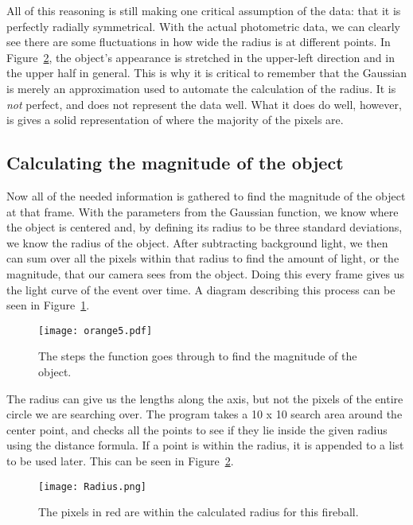 All of this reasoning is still making one critical assumption of the data: that it is perfectly radially symmetrical. With the actual photometric data, we can clearly see there are some fluctuations in how wide the radius is at different points. In Figure~\ref{fig:radius}, the object's appearance is stretched in the upper-left direction and in the upper half in general. This is why it is critical to remember that the Gaussian is merely an approximation used to automate the calculation of the radius. It is \textit{not} perfect, and does not represent the data well. What it does do well, however, is gives a solid representation of where the majority of the pixels are.

\subsection{Calculating the magnitude of the object}

Now all of the needed information is gathered to find the magnitude of the object at that frame. With the parameters from the Gaussian function, we know where the object is centered and, by defining its radius to be three standard deviations, we know the radius of the object. After subtracting background light, we then can sum over all the pixels within that radius to find the amount of light, or the magnitude, that our camera sees from the object.  Doing this every frame gives us the light curve of the event over time. A diagram describing this process can be seen in Figure~\ref{fig:magfinder}.

\begin{figure}[htpb]
	\centering
	\texttt{[image: orange5.pdf]}
	\caption{The steps the function goes through to find the magnitude of the object.}
	\label{fig:magfinder}
\end{figure}

The radius can give us the lengths along the axis, but not the pixels of the entire circle we are searching over. The program takes a 10 x 10 search area around the center point, and checks all the points to see if they lie inside the given radius using the distance formula. If a point is within the radius, it is appended to a list to be used later. This can be seen in Figure~\ref{fig:radius}.

\begin{figure}[ht!]
	\centering
	\texttt{[image: Radius.png]}
	\caption{The pixels in red are within the calculated radius for this fireball.}
	\label{fig:radius}
\end{figure}

